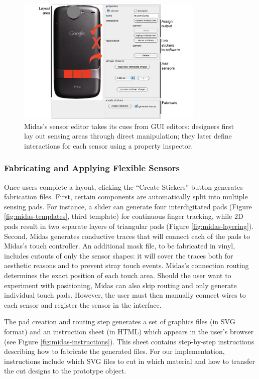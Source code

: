 \begin{figure}[b!]
\centering
\includegraphics[width=3.5in]{figures/midas/ui.png}
\caption{Midas's sensor editor takes its cues from GUI editors: designers first lay out sensing areas through direct manipulation; they later define interactions for each sensor using a property inspector.} 
\label{fig:midas-editor}
\end{figure}


        \subsubsection{Fabricating and Applying Flexible Sensors}
Once users complete a layout, clicking the ``Create Stickers''
button generates fabrication files. First, certain components
are automatically split into multiple sensing pads. For instance,
a slider can generate four interdigitated pads (Figure \ref{fig:midas-templates}, third template) for continuous finger tracking, while
2D pads result in two separate layers of triangular pads (Figure
\ref{fig:midas-layering}). Second, Midas generates conductive traces that will
connect each of the pads to Midas's touch controller. An additional mask file, to be fabricated in vinyl, includes cutouts
of only the sensor shapes: it will cover the traces both for aesthetic
reasons and to prevent stray touch events. Midas's connection
routing determines the exact position of each touch
area. Should the user want to experiment with positioning,
Midas can also skip routing and only generate individual
touch pads. However, the user must then manually connect
wires to each sensor and register the sensor in the interface.

The pad creation and routing step generates a set of graphics
files (in SVG format) and an instruction sheet (in HTML)
which appears in the user's browser (see Figure \ref{fig:midas-instructions}). This sheet
contains step-by-step instructions describing how to fabricate
the generated files. For our implementation, instructions include
which SVG files to cut in which material and how to
transfer the cut designs to the prototype object.

